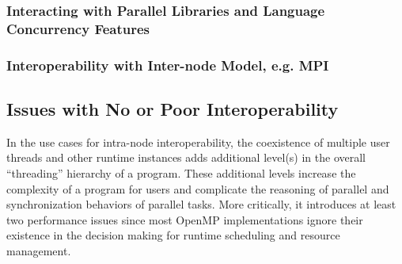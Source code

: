%

\subsubsection{Interacting with Parallel Libraries and Language Concurrency Features}



\subsubsection{Interoperability with Inter-node Model, e.g. MPI}




\subsection{Issues with No or Poor Interoperability}
In the use cases for intra-node interoperability, 
the coexistence of multiple user threads and other runtime instances
adds additional level(s) in the overall ``threading''
hierarchy of a program. %
These additional levels increase the complexity of a program for 
users and complicate the reasoning of parallel and synchronization behaviors of parallel tasks. 
More critically, it introduces at least two performance issues
since most OpenMP implementations ignore their existence %
in the decision making for runtime scheduling and resource management. 

